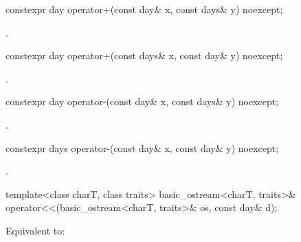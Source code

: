 %
\begin{itemdecl}
constexpr day operator+(const day& x, const days& y) noexcept;
\end{itemdecl}

\begin{itemdescr}
\pnum
\returns
{}.
\end{itemdescr}

%
\begin{itemdecl}
constexpr day operator+(const days& x, const day& y) noexcept;
\end{itemdecl}

\begin{itemdescr}
\pnum
\returns
{}.
\end{itemdescr}

%
\begin{itemdecl}
constexpr day operator-(const day& x, const days& y) noexcept;
\end{itemdecl}

\begin{itemdescr}
\pnum
\returns
{}.
\end{itemdescr}

%
\begin{itemdecl}
constexpr days operator-(const day& x, const day& y) noexcept;
\end{itemdecl}

\begin{itemdescr}
\pnum
\returns
{}.
\end{itemdescr}

%
\begin{itemdecl}
template<class charT, class traits>
  basic_ostream<charT, traits>&
    operator<<(basic_ostream<charT, traits>& os, const day& d);
\end{itemdecl}

\begin{itemdescr}
\pnum
\effects
Equivalent to:
\end{itemdescr}


